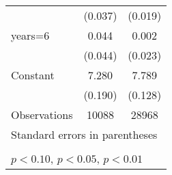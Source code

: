 \begin{table}[htbp]
\begin{tabular}{l*{2}{c}}
                    &     (0.037)         &     (0.019)         \\
\addlinespace
years=6             &       0.044         &       0.002         \\
                    &     (0.044)         &     (0.023)         \\
\addlinespace
Constant            &       7.280\sym{***}&       7.789\sym{***}\\
                    &     (0.190)         &     (0.128)         \\
\midrule
Observations        &       10088         &       28968         \\
\bottomrule
\multicolumn{3}{l}{\footnotesize Standard errors in parentheses}\\
\multicolumn{3}{l}{\footnotesize }\\
\multicolumn{3}{l}{\footnotesize \sym{*} \(p<0.10\), \sym{**} \(p<0.05\), \sym{***} \(p<0.01\)}\\
\end{tabular}
\end{table}
